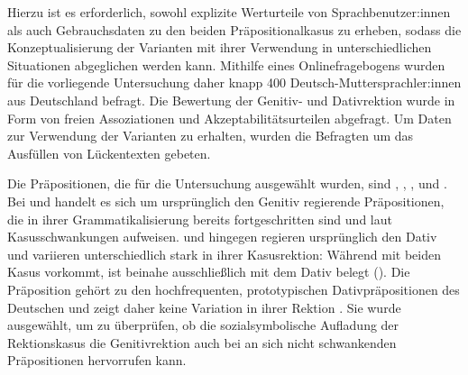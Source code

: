 \begin{sloppypar}
\noindent
Hierzu ist es erforderlich, sowohl explizite Werturteile von Sprachbenutzer:innen als auch Gebrauchsdaten zu den beiden Präpositionalkasus zu erheben, sodass die Konzeptualisierung der Varianten mit ihrer Verwendung in unterschiedlichen Situationen abgeglichen werden kann. 
Mithilfe eines Onlinefragebogens wurden für die vorliegende Untersuchung daher knapp 400 Deutsch\hyp Muttersprachler:innen aus Deutschland befragt.  
Die Bewertung der Genitiv- und Dativrektion wurde in Form von freien Assoziationen und Akzeptabilitätsurteilen abgefragt. 
Um Daten zur Verwendung der Varianten zu erhalten, wurden die Befragten um das Ausfüllen von Lückentexten gebeten. 
\end{sloppypar}

Die Präpositionen, die für die Untersuchung ausgewählt wurden, sind \wegen{}, \waehrend{}, \dank{}, \gegenueber{} und . 
Bei \wegen{} und \waehrend{} handelt es sich um ursprünglich den Genitiv regierende Präpositionen, die in ihrer Grammatikalisierung bereits fortgeschritten sind und laut \citet[][§1450]{Duden2022} Kasusschwankungen aufweisen. 
 und \gegenueber{} hingegen regieren ursprünglich den Dativ und variieren unterschiedlich stark in ihrer Kasusrektion: 
Während \dank{} mit beiden Kasus vorkommt, ist \gegenueber{} beinahe ausschließlich mit dem Dativ belegt (\citealp[s.][§1449]{Duden2022}). 
Die Präposition  gehört zu den hochfrequenten, prototypischen Dativpräpositionen des Deutschen und zeigt daher keine Variation in ihrer Rektion \citep[s.][94]{Szczepaniak2011}. 
Sie wurde ausgewählt, um zu überprüfen, ob die sozialsymbolische Aufladung der Rektionskasus die Genitivrektion auch bei an sich nicht schwankenden Präpositionen hervorrufen kann. 

